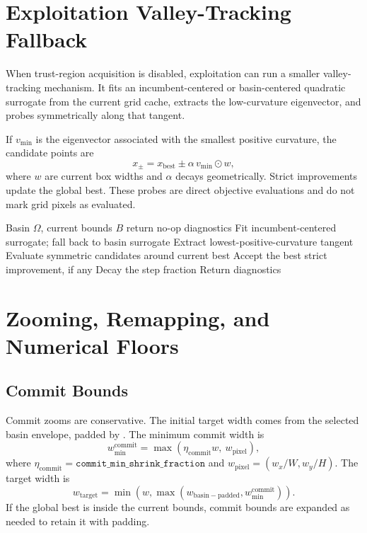 \documentclass[11pt]{article}
\newcommand{\code}[1]{\texttt{\detokenize{#1}}}
\begin{document}
\section{Exploitation Valley-Tracking Fallback}

When trust-region acquisition is disabled, exploitation can run a smaller
valley-tracking mechanism. It fits an incumbent-centered or basin-centered
quadratic surrogate from the current grid cache, extracts the low-curvature
eigenvector, and probes symmetrically along that tangent.

If $v_{\min}$ is the eigenvector associated with the smallest positive
curvature, the candidate points are
\begin{equation}
x_{\pm}=x_{\mathrm{best}}\pm \alpha\, v_{\min}\odot w,
\label{eq:valley-probes}
\end{equation}
where $w$ are current box widths and $\alpha$ decays geometrically. Strict
improvements update the global best. These probes are direct objective
evaluations and do not mark grid pixels as evaluated.

\begin{algorithm}
\caption{Exploitation valley-tracking fallback}
\begin{algorithmic}[1]
\Require Basin $\Omega$, current bounds $B$
    \State return no-op diagnostics
\EndIf
\State Fit incumbent-centered surrogate; fall back to basin surrogate
\State Extract lowest-positive-curvature tangent
    \State Evaluate symmetric candidates around current best
    \State Accept the best strict improvement, if any
    \State Decay the step fraction
\EndWhile
\State Return diagnostics
\end{algorithmic}
\label{alg:valley-tracking}
\end{algorithm}

\section{Zooming, Remapping, and Numerical Floors}

\subsection{Commit Bounds}

Commit zooms are conservative. The initial target width comes from the
selected basin envelope, padded by \code{commit_zoom_padding}. The minimum
commit width is
\begin{equation}
w_{\min}^{\mathrm{commit}}
= \max(\eta_{\mathrm{commit}}w,\ w_{\mathrm{pixel}}),
\label{eq:commit-floor}
\end{equation}
where $\eta_{\mathrm{commit}}=\texttt{commit\_min\_shrink\_fraction}$ and
$w_{\mathrm{pixel}}=(w_x/W,w_y/H)$. The target width is
\begin{equation}
w_{\mathrm{target}}
=\min\left(w,\max(w_{\mathrm{basin-padded}},w_{\min}^{\mathrm{commit}})\right).
\label{eq:commit-target-width}
\end{equation}
If the global best is inside the current bounds, commit bounds are expanded
as needed to retain it with padding.
\end{document}
